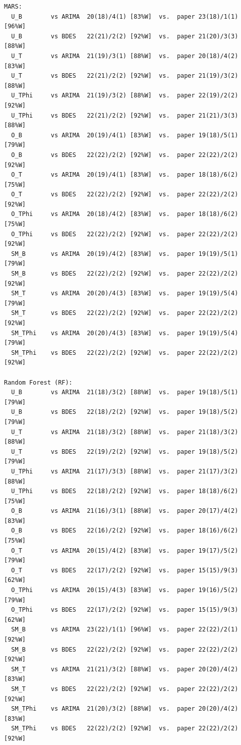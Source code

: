 \begin{verbatim}
MARS:
  U_B        vs ARIMA  20(18)/4(1) [83%W]  vs.  paper 23(18)/1(1) [96%W]
  U_B        vs BDES   22(21)/2(2) [92%W]  vs.  paper 21(20)/3(3) [88%W]
  U_T        vs ARIMA  21(19)/3(1) [88%W]  vs.  paper 20(18)/4(2) [83%W]
  U_T        vs BDES   22(21)/2(2) [92%W]  vs.  paper 21(19)/3(2) [88%W]
  U_TPhi     vs ARIMA  21(19)/3(2) [88%W]  vs.  paper 22(19)/2(2) [92%W]
  U_TPhi     vs BDES   22(21)/2(2) [92%W]  vs.  paper 21(21)/3(3) [88%W]
  O_B        vs ARIMA  20(19)/4(1) [83%W]  vs.  paper 19(18)/5(1) [79%W]
  O_B        vs BDES   22(22)/2(2) [92%W]  vs.  paper 22(22)/2(2) [92%W]
  O_T        vs ARIMA  20(19)/4(1) [83%W]  vs.  paper 18(18)/6(2) [75%W]
  O_T        vs BDES   22(22)/2(2) [92%W]  vs.  paper 22(22)/2(2) [92%W]
  O_TPhi     vs ARIMA  20(18)/4(2) [83%W]  vs.  paper 18(18)/6(2) [75%W]
  O_TPhi     vs BDES   22(22)/2(2) [92%W]  vs.  paper 22(22)/2(2) [92%W]
  SM_B       vs ARIMA  20(19)/4(2) [83%W]  vs.  paper 19(19)/5(1) [79%W]
  SM_B       vs BDES   22(22)/2(2) [92%W]  vs.  paper 22(22)/2(2) [92%W]
  SM_T       vs ARIMA  20(20)/4(3) [83%W]  vs.  paper 19(19)/5(4) [79%W]
  SM_T       vs BDES   22(22)/2(2) [92%W]  vs.  paper 22(22)/2(2) [92%W]
  SM_TPhi    vs ARIMA  20(20)/4(3) [83%W]  vs.  paper 19(19)/5(4) [79%W]
  SM_TPhi    vs BDES   22(22)/2(2) [92%W]  vs.  paper 22(22)/2(2) [92%W]

Random Forest (RF):
  U_B        vs ARIMA  21(18)/3(2) [88%W]  vs.  paper 19(18)/5(1) [79%W]
  U_B        vs BDES   22(18)/2(2) [92%W]  vs.  paper 19(18)/5(2) [79%W]
  U_T        vs ARIMA  21(18)/3(2) [88%W]  vs.  paper 21(18)/3(2) [88%W]
  U_T        vs BDES   22(19)/2(2) [92%W]  vs.  paper 19(18)/5(2) [79%W]
  U_TPhi     vs ARIMA  21(17)/3(3) [88%W]  vs.  paper 21(17)/3(2) [88%W]
  U_TPhi     vs BDES   22(18)/2(2) [92%W]  vs.  paper 18(18)/6(2) [75%W]
  O_B        vs ARIMA  21(16)/3(1) [88%W]  vs.  paper 20(17)/4(2) [83%W]
  O_B        vs BDES   22(16)/2(2) [92%W]  vs.  paper 18(16)/6(2) [75%W]
  O_T        vs ARIMA  20(15)/4(2) [83%W]  vs.  paper 19(17)/5(2) [79%W]
  O_T        vs BDES   22(17)/2(2) [92%W]  vs.  paper 15(15)/9(3) [62%W]
  O_TPhi     vs ARIMA  20(15)/4(3) [83%W]  vs.  paper 19(16)/5(2) [79%W]
  O_TPhi     vs BDES   22(17)/2(2) [92%W]  vs.  paper 15(15)/9(3) [62%W]
  SM_B       vs ARIMA  23(22)/1(1) [96%W]  vs.  paper 22(22)/2(1) [92%W]
  SM_B       vs BDES   22(22)/2(2) [92%W]  vs.  paper 22(22)/2(2) [92%W]
  SM_T       vs ARIMA  21(21)/3(2) [88%W]  vs.  paper 20(20)/4(2) [83%W]
  SM_T       vs BDES   22(22)/2(2) [92%W]  vs.  paper 22(22)/2(2) [92%W]
  SM_TPhi    vs ARIMA  21(20)/3(2) [88%W]  vs.  paper 20(20)/4(2) [83%W]
  SM_TPhi    vs BDES   22(22)/2(2) [92%W]  vs.  paper 22(22)/2(2) [92%W]


\end{verbatim}
